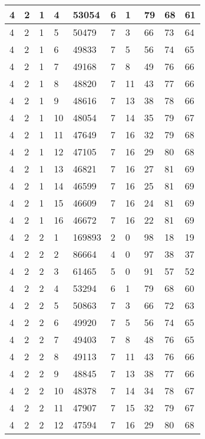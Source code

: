 \begin{table}[!ht]
\begin{tabular}{|l|l|l|l|l|l|l|l|l|l|}
        4 & 2 & 1 & 4 & 53054 & 6 & 1 & 79 & 68 & 61 \\ \hline
        4 & 2 & 1 & 5 & 50479 & 7 & 3 & 66 & 73 & 64 \\ \hline
        4 & 2 & 1 & 6 & 49833 & 7 & 5 & 56 & 74 & 65 \\ \hline
        4 & 2 & 1 & 7 & 49168 & 7 & 8 & 49 & 76 & 66 \\ \hline
        4 & 2 & 1 & 8 & 48820 & 7 & 11 & 43 & 77 & 66 \\ \hline
        4 & 2 & 1 & 9 & 48616 & 7 & 13 & 38 & 78 & 66 \\ \hline
        4 & 2 & 1 & 10 & 48054 & 7 & 14 & 35 & 79 & 67 \\ \hline
        4 & 2 & 1 & 11 & 47649 & 7 & 16 & 32 & 79 & 68 \\ \hline
        4 & 2 & 1 & 12 & 47105 & 7 & 16 & 29 & 80 & 68 \\ \hline
        4 & 2 & 1 & 13 & 46821 & 7 & 16 & 27 & 81 & 69 \\ \hline
        4 & 2 & 1 & 14 & 46599 & 7 & 16 & 25 & 81 & 69 \\ \hline
        4 & 2 & 1 & 15 & 46609 & 7 & 16 & 24 & 81 & 69 \\ \hline
        4 & 2 & 1 & 16 & 46672 & 7 & 16 & 22 & 81 & 69 \\ \hline
        4 & 2 & 2 & 1 & 169893 & 2 & 0 & 98 & 18 & 19 \\ \hline
        4 & 2 & 2 & 2 & 86664 & 4 & 0 & 97 & 38 & 37 \\ \hline
        4 & 2 & 2 & 3 & 61465 & 5 & 0 & 91 & 57 & 52 \\ \hline
        4 & 2 & 2 & 4 & 53294 & 6 & 1 & 79 & 68 & 60 \\ \hline
        4 & 2 & 2 & 5 & 50863 & 7 & 3 & 66 & 72 & 63 \\ \hline
        4 & 2 & 2 & 6 & 49920 & 7 & 5 & 56 & 74 & 65 \\ \hline
        4 & 2 & 2 & 7 & 49403 & 7 & 8 & 48 & 76 & 65 \\ \hline
        4 & 2 & 2 & 8 & 49113 & 7 & 11 & 43 & 76 & 66 \\ \hline
        4 & 2 & 2 & 9 & 48845 & 7 & 13 & 38 & 77 & 66 \\ \hline
        4 & 2 & 2 & 10 & 48378 & 7 & 14 & 34 & 78 & 67 \\ \hline
        4 & 2 & 2 & 11 & 47907 & 7 & 15 & 32 & 79 & 67 \\ \hline
        4 & 2 & 2 & 12 & 47594 & 7 & 16 & 29 & 80 & 68 \\ \hline

\end{tabular}
\end{table}
